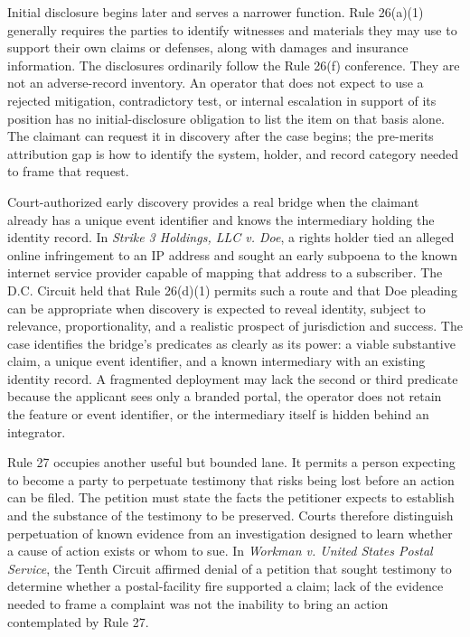 Initial disclosure begins later and serves a narrower function. Rule 26(a)(1) generally requires the parties to identify witnesses and materials they may use to support their own claims or defenses, along with damages and insurance information. The disclosures ordinarily follow the Rule 26(f) conference. They are not an adverse-record inventory. An operator that does not expect to use a rejected mitigation, contradictory test, or internal escalation in support of its position has no initial-disclosure obligation to list the item on that basis alone. The claimant can request it in discovery after the case begins; the pre-merits attribution gap is how to identify the system, holder, and record category needed to frame that request.

Court-authorized early discovery provides a real bridge when the claimant already has a unique event identifier and knows the intermediary holding the identity record. In \emph{Strike 3 Holdings, LLC v. Doe}, a rights holder tied an alleged online infringement to an IP address and sought an early subpoena to the known internet service provider capable of mapping that address to a subscriber. The D.C. Circuit held that Rule 26(d)(1) permits such a route and that Doe pleading can be appropriate when discovery is expected to reveal identity, subject to relevance, proportionality, and a realistic prospect of jurisdiction and success. The case identifies the bridge's predicates as clearly as its power: a viable substantive claim, a unique event identifier, and a known intermediary with an existing identity record. A fragmented deployment may lack the second or third predicate because the applicant sees only a branded portal, the operator does not retain the feature or event identifier, or the intermediary itself is hidden behind an integrator.

Rule 27 occupies another useful but bounded lane. It permits a person expecting to become a party to perpetuate testimony that risks being lost before an action can be filed. The petition must state the facts the petitioner expects to establish and the substance of the testimony to be preserved. Courts therefore distinguish perpetuation of known evidence from an investigation designed to learn whether a cause of action exists or whom to sue. In \emph{Workman v. United States Postal Service}, the Tenth Circuit affirmed denial of a petition that sought testimony to determine whether a postal-facility fire supported a claim; lack of the evidence needed to frame a complaint was not the inability to bring an action contemplated by Rule 27.

